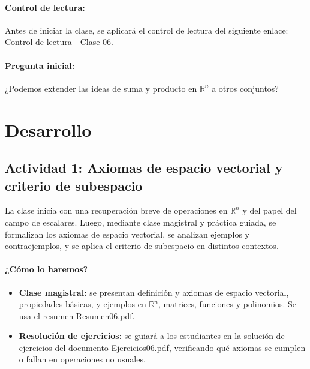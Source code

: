 \documentclass[a4,11pt]{aleph-notas}
\begin{document}
\paragraph{Control de lectura:}
Antes de iniciar la clase, se aplicará el control de lectura del siguiente enlace:
\href{https://gemini.google.com/share/cb5551a4eb1e}{Control de lectura - Clase 06}.

\paragraph{Pregunta inicial:}
¿Podemos extender las ideas de suma y producto en $\mathbb{R}^n$ a otros conjuntos?

\section*{Desarrollo}

\subsection*{Actividad 1: Axiomas de espacio vectorial y criterio de subespacio}

La clase inicia con una recuperación breve de operaciones en $\mathbb{R}^n$ y del papel del campo de escalares. Luego, mediante clase magistral y práctica guiada, se formalizan los axiomas de espacio vectorial, se analizan ejemplos y contraejemplos, y se aplica el criterio de subespacio en distintos contextos.

\paragraph{¿Cómo lo haremos?}
\begin{itemize}[leftmargin=*]
    \item \textbf{Clase magistral:} se presentan definición y axiomas de espacio vectorial, propiedades básicas, y ejemplos en $\mathbb{R}^n$, matrices, funciones y polinomios. Se usa el resumen \href{https://fcena-puce.github.io/AlgebraLineal-05-N0048/01Resumen/Resumen06.pdf}{Resumen06.pdf}.
    \item \textbf{Resolución de ejercicios:} se guiará a los estudiantes en la solución de ejercicios del documento \href{https://fcena-puce.github.io/AlgebraLineal-05-N0048/04Ejercicios/Ejercicios06.pdf}{Ejercicios06.pdf}, verificando qué axiomas se cumplen o fallan en operaciones no usuales.
\end{itemize}
\end{document}
